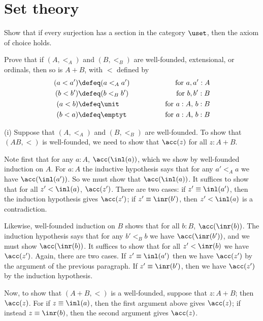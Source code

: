 \begin{coqdoccode}
\end{coqdoccode}
\section{Set theory}




Show that if every surjection has a section in the category $\uset$, then the
axiom of choice holds.



Prove that if $(A, <_{A})$ and $(B, <_{B})$ are well-founded, extensional,
or ordinals, then so is $A + B$, with $<$ defined by
\begin{alignat*}{3}
  (a < a') &\defeq (a <_{A} a') &\qquad\qquad \text{for $a, a' : A$} \\
  (b < b') &\defeq (b <_{B} b') &\qquad\qquad \text{for $b, b' : B$} \\
  (a < b) &\defeq \unit &\qquad\qquad \text{for $a: A$, $b : B$} \\
  (b < a) &\defeq \emptyt &\qquad\qquad \text{for $a : A$, $b : B$}
\end{alignat*}


 \soln
(i)
Suppose that $(A, <_{A})$ and $(B, <_{B})$ are well-founded.  To show that $(A
B, <)$ is well-founded, we need to show that $\acc(z)$ for all $z : A+B$.


Note first that for any $a : A$, $\acc(\inl(a))$, which we show by well-founded
induction on $A$.  For $a : A$ the inductive hypothesis says that for any $a'
<_{A} a$ we have $\acc(\inl(a'))$. So we must show that $\acc(\inl(a))$.  It
suffices to show that for all $z' < \inl(a)$, $\acc(z')$.  There are two cases:
if $z' \equiv \inl(a')$, then the induction hypothesis gives $\acc(z')$; if $z'
\equiv \inr(b')$, then $z' < \inl(a)$ is a contradiction.


Likewise, well-founded induction on $B$ shows that for all $b : B$,
$\acc(\inr(b))$.  The induction hypothesis says that for any $b' <_{B} b$ we
have $\acc(\inr(b'))$, and we must show $\acc(\inr(b))$.  It suffices to show
that for all $z' < \inr(b)$ we have $\acc(z')$.  Again, there are two cases.
If $z' \equiv \inl(a')$ then we have $\acc(z')$ by the argument of the previous
paragraph.  If $z' \equiv \inr(b')$, then we have $\acc(z')$ by the induction
hypothesis.


Now, to show that $(A + B, <)$ is a well-founded, suppose that $z : A + B$;
then $\acc(z)$.  For if $z \equiv \inl(a)$, then the first argument above gives
$\acc(z)$; if instead $z \equiv \inr(b)$, then the second argument gives
$\acc(z)$.


